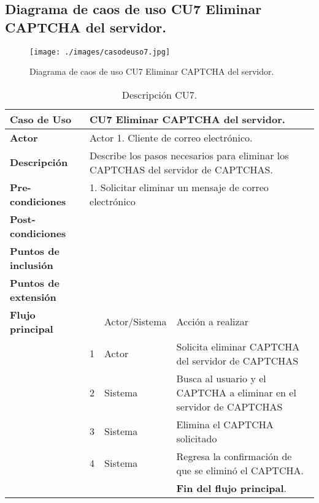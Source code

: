 \documentclass[12pt,oneside,onecolumn,openany]{report}
\begin{document}
\pagebreak
\subsection{Diagrama de caos de uso CU7 Eliminar CAPTCHA del servidor.}
\begin{figure}[H]
	\texttt{[image: ./images/casodeuso7.jpg]}
	\caption{Diagrama de caos de uso CU7 Eliminar CAPTCHA del servidor.}
	\label{fig:4-8-1}
\end{figure}
\begin{table}[H]
 \centering
   {
     \begin{tabular}{| p{} | p{} |p{4cm}|p{5cm}|}
     \hline
     \textbf{Caso de Uso} &\multicolumn{3}{|l|}{CU7 Eliminar CAPTCHA del servidor.}\\
     \hline
     \textbf{Actor} & \multicolumn{3}{|l|}{Actor 1. Cliente de correo electrónico.}\\
     \hline
     \textbf{Descripción} & \multicolumn{3}{|p{10cm}|}{Describe los pasos necesarios para eliminar los CAPTCHAS del servidor de CAPTCHAS.}\\
     \hline
     \textbf{Pre-condiciones} & \multicolumn{3}{|l|}{1. Solicitar eliminar un mensaje de correo electrónico}\\
     \hline
     \textbf{Post-condiciones} & \multicolumn{3}{|l|}{}\\
     \hline
     \textbf{Puntos de inclusión} & \multicolumn{3}{|l|}{}\\
     \hline
     \textbf{Puntos de extensión} & \multicolumn{3}{|l|}{}\\
     \hline
     \textbf{Flujo principal} & & Actor/Sistema & Acción a realizar\\
     \hline
     & 1 & Actor & Solicita eliminar CAPTCHA del servidor de CAPTCHAS\\
     \hline
     & 2 & Sistema & Busca al usuario y el CAPTCHA a eliminar en el servidor de CAPTCHAS\\
     \hline
     & 3 & Sistema & Elimina el CAPTCHA solicitado\\
     \hline
     & 4 & Sistema & Regresa la confirmación de que se eliminó el CAPTCHA.\\
     \hline
     & & & \textbf{Fin del flujo principal}.\\
          
     \end{tabular}
    }
    \caption{Descripción CU7.}
    \label{tabla:CU7}
\end{table}
\end{document}
